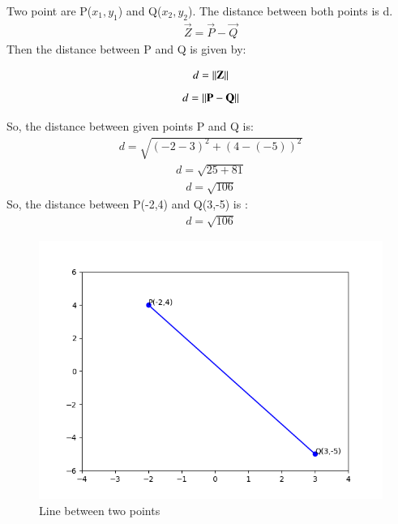 Two point are P($x_{1},y_{1}$) and Q($x_{2},y_{2}$). The distance between both points is d.\\
\begin{align}
    \vec{Z} = \vec{P} - \vec{Q}  
\end{align}   
\vspace{0.5 cm}
Then the distance between P and Q is given by:

\begin{align}
   d = \left\lVert\mathbf{Z}\right\rVert
\end{align}
\begin{align}
   d = \left\lVert\mathbf{P} - \mathbf{Q}\right\rVert 
\end{align}

So, the distance between given points P and Q is:
\begin{align}
   d = \sqrt{(-2-3)^2 + (4-(-5))^2}    
\end{align}
\begin{align}
   d = \sqrt{25+81}    
\end{align}
\begin{align}
   d = \sqrt{106}    
\end{align}
So, the distance between P(-2,4) and Q(3,-5) is :
\begin{align}
   d = \sqrt{106}
\end{align}

\begin{figure}[t]
    \centering
    \includegraphics[width = \columnwidth]{./solutions/1/1/1/AI_assignment_1.png}
    \caption{Line between two points}
    \label{eq:solutions/1/1/1/fig:Line between two points}
\end{figure}



